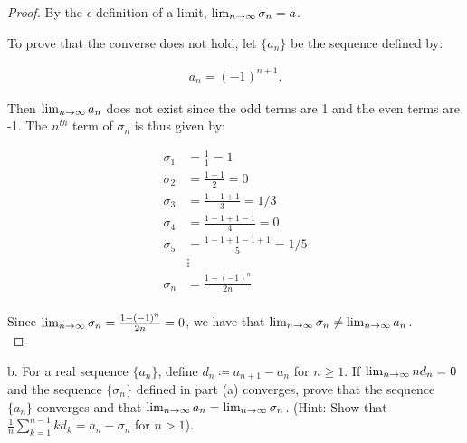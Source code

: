 \begin{proof}
        By the $\epsilon$-definition of a limit,
        ${\lim_{n \rightarrow \infty}{\sigma_n}} = a$.
        \pagebreak

        To prove that the converse does not hold, let $\{a_n\}$ be the
        sequence defined by:

        \begin{align*}
            a_n = (-1)^{n+1}.
        \end{align*}
        
        Then ${\lim_{n \rightarrow \infty}{a_n}}$ does not exist since the odd
        terms are 1 and the even terms are -1. The $n^{th}$ term of
        $\sigma_n$ is thus given by:

        \begin{align*}
            \sigma_1 &= \frac{1}{1} = 1 \\
            \sigma_2 &= \frac{1 - 1}{2} = 0 \\
            \sigma_3 &= \frac{1 - 1 + 1}{3} = 1/3 \\
            \sigma_4 &= \frac{1 - 1 + 1 - 1}{4} = 0 \\
            \sigma_5 &= \frac{1 - 1 + 1 - 1 + 1}{5} = 1/5 \\
                     &\vdots \\
            \sigma_n &= \frac{1 - (-1)^n}{2n} \\
        \end{align*}

        Since ${\lim_{n \rightarrow \infty}{\sigma_n = \frac{1 - (-1)^n}{2n}}} = 0$,
        we have that
        ${\lim_{n \rightarrow \infty}{\sigma_n}} \neq {\lim_{n \rightarrow \infty}{a_n}}$.
        \\
    \end{proof}
    \pagebreak

b.  For a real sequence $\{a_n\}$, define $d_n \coloneqq a_{n+1} - a_n$ for
    $n \ge 1$. If ${\lim_{n \rightarrow \infty}{nd_n}} = 0$ and the sequence
    $\{\sigma_n\}$ defined in part (a) converges, prove that the sequence
    $\{a_n\}$ converges and that
    ${\lim_{n \rightarrow \infty}{a_n}} = {\lim_{n \rightarrow \infty}{\sigma_n}}$.
    (Hint: Show that $\frac{1}{n}\sum\limits_{k=1}^{n-1}{kd_k} = a_n - \sigma_n$
     for $n > 1$).

